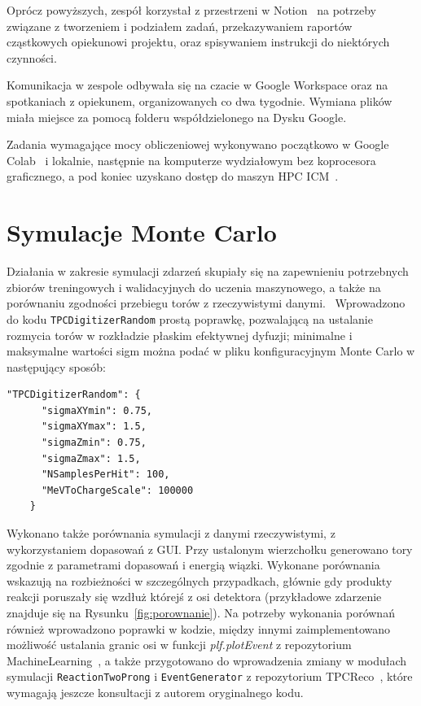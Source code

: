 \documentclass{article}
\begin{document}
Oprócz powyższych, zespół korzystał z przestrzeni w Notion~\cite{Notion} na potrzeby związane z tworzeniem i podziałem zadań, przekazywaniem raportów cząstkowych opiekunowi projektu, oraz spisywaniem instrukcji do niektórych czynności. 

Komunikacja w zespole odbywała się na czacie w Google Workspace oraz na spotkaniach z opiekunem, organizowanych co dwa tygodnie. Wymiana plików miała miejsce za pomocą folderu współdzielonego na Dysku Google.

Zadania wymagające mocy obliczeniowej wykonywano początkowo w Google Colab~\cite{Colab} i lokalnie, następnie na komputerze wydziałowym bez koprocesora graficznego, a pod koniec uzyskano dostęp do maszyn HPC ICM~\cite{ICM}.

\section{Symulacje Monte Carlo}
Działania w zakresie symulacji zdarzeń skupiały się na zapewnieniu potrzebnych zbiorów treningowych i walidacyjnych do uczenia maszynowego, a także na porównaniu zgodności przebiegu torów z rzeczywistymi danymi.
\ 
Wprowadzono do kodu \texttt{TPCDigitizerRandom} prostą poprawkę, pozwalającą na ustalanie rozmycia torów w rozkładzie płaskim efektywnej dyfuzji; minimalne i maksymalne wartości sigm można podać w pliku konfiguracyjnym Monte Carlo w następujący sposób:

\begin{verbatim}
"TPCDigitizerRandom": {
      "sigmaXYmin": 0.75,
      "sigmaXYmax": 1.5,
      "sigmaZmin": 0.75,
      "sigmaZmax": 1.5,
      "NSamplesPerHit": 100,
      "MeVToChargeScale": 100000
    }
\end{verbatim}
 
Wykonano także porównania symulacji z danymi rzeczywistymi, z wykorzystaniem dopasowań z GUI. Przy ustalonym wierzchołku generowano tory zgodnie z parametrami dopasowań i energią wiązki. Wykonane porównania wskazują na rozbieżności w szczególnych przypadkach, głównie gdy produkty reakcji poruszały się wzdłuż którejś z osi detektora (przykładowe zdarzenie znajduje się na Rysunku~\ref{fig:porownanie}). Na potrzeby wykonania porównań również wprowadzono poprawki w kodzie, między innymi zaimplementowano możliwość ustalania granic osi w funkcji \textit{plf.plotEvent} z repozytorium MachineLearning~\cite{WAWTPCfork}, a także przygotowano do wprowadzenia zmiany w modułach symulacji \texttt{ReactionTwoProng} i \texttt{EventGenerator} z repozytorium TPCReco~\cite{TPCRecofork}, które wymagają jeszcze konsultacji z autorem oryginalnego kodu.
\end{document}
